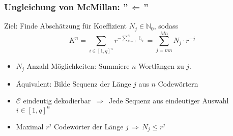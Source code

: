 \documentclass{beamer}
\begin{document}

\begin{frame}[t]
    \frametitle{Ungleichung von McMillan: ''$\,\Longleftarrow\,$''}
    Ziel: Finde Abschätzung für Koeffizient $N_j \in \mathbb{N}_0$, sodass
    $$
        K^n = \sum_{i\in [1,q]^n} r^{-\sum_{k=1}^{n} \ell_{i_k}}
        = \sum_{j=mn}^{Mn} N_j \cdot r^{-j}
    $$
    \pause

    \begin{itemize}
        \setlength\itemsep{1em}
        \item $N_j$ Anzahl Möglichkeiten: Summiere $n$ Wortlängen zu $j$.
        \pause
        \item Äquivalent: Bilde Sequenz der Länge $j$ aus $n$ Codewörtern
        \pause
        \item $\mathcal{C}$ eindeutig dekodierbar
            $\,\Longrightarrow\,$ Jede Sequenz aus eindeutiger Auswahl
                $i \in [1,q]^n$
        \pause
        \item Maximal $r^j$ Codewörter der Länge $j \,\Longrightarrow\, N_j \leq r^j$
    \end{itemize}

\end{frame}
\end{document}
